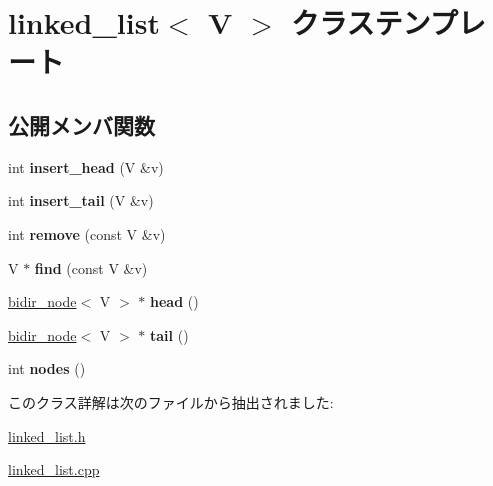 \hypertarget{classlinked__list}{}\section{linked\+\_\+list$<$ V $>$ クラステンプレート}
\label{classlinked__list}
\subsection*{公開メンバ関数}
\begin{DoxyCompactItemize}
\item 
\hypertarget{classlinked__list_aa87b1801b0701151561b449df924a1f6}{}int {\bfseries insert\+\_\+head} (V \&v)\label{classlinked__list_aa87b1801b0701151561b449df924a1f6}

\item 
\hypertarget{classlinked__list_a97ae2482ebf484475b017dfd104b4860}{}int {\bfseries insert\+\_\+tail} (V \&v)\label{classlinked__list_a97ae2482ebf484475b017dfd104b4860}

\item 
\hypertarget{classlinked__list_a449bb389d8a0562078effe8a5cbce4ed}{}int {\bfseries remove} (const V \&v)\label{classlinked__list_a449bb389d8a0562078effe8a5cbce4ed}

\item 
\hypertarget{classlinked__list_aed6c01e534aab66ece6429d836f39f8f}{}V $\ast$ {\bfseries find} (const V \&v)\label{classlinked__list_aed6c01e534aab66ece6429d836f39f8f}

\item 
\hypertarget{classlinked__list_a5ec6ef95a6d392bb7389637d9e5d87b5}{}\hyperlink{classbidir__node}{bidir\+\_\+node}$<$ V $>$ $\ast$ {\bfseries head} ()\label{classlinked__list_a5ec6ef95a6d392bb7389637d9e5d87b5}

\item 
\hypertarget{classlinked__list_aefd6410f20630d227f0d4d4ed895d15b}{}\hyperlink{classbidir__node}{bidir\+\_\+node}$<$ V $>$ $\ast$ {\bfseries tail} ()\label{classlinked__list_aefd6410f20630d227f0d4d4ed895d15b}

\item 
\hypertarget{classlinked__list_aa79d43937baecb85adc0731c3c078129}{}int {\bfseries nodes} ()\label{classlinked__list_aa79d43937baecb85adc0731c3c078129}

\end{DoxyCompactItemize}


このクラス詳解は次のファイルから抽出されました\+:\begin{DoxyCompactItemize}
\item 
\hyperlink{linked__list_8h}{linked\+\_\+list.\+h}\item 
\hyperlink{linked__list_8cpp}{linked\+\_\+list.\+cpp}\end{DoxyCompactItemize}
